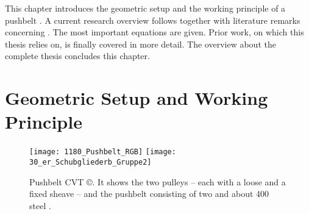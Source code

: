 This chapter introduces the geometric setup and the working principle of a pushbelt \CVT.
A current research overview follows together with literature remarks concerning \MBS.
The most important equations are given.
Prior work, on which this thesis relies on, is finally covered in more detail.
The overview about the complete thesis concludes this chapter.

\section{Geometric Setup and Working Principle} \label{sec:GeometricSetup}

\begin{figure}[h!tp]
\begin{center}
  \texttt{[image: 1180\_Pushbelt\_RGB]}
  \hfill
  \texttt{[image: 30\_er\_Schubgliederb\_Gruppe2]}
  \caption[Pushbelt CVT]{Pushbelt CVT \copyright\Bosch. It shows the two pulleys -- each with a loose and a fixed sheave -- and the pushbelt consisting of two \rings and about 400 steel \els.}
  \label{fig:PIC_141223_Bosch-Variator-Pushbelt-Elements}
\end{center}
\end{figure}

